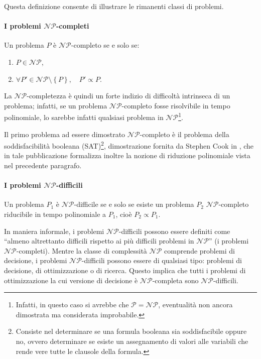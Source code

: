 Questa definizione consente di illustrare le rimanenti classi di problemi.

\paragraph{I problemi $\mathcal{NP}$-completi}
\begin{mydef}
 Un problema $P$ è $\mathcal{NP}$-completo se e solo se:
 \begin{enumerate}
  \item $P \in \mathcal{NP}$,
  \item $\forall P' \in \mathcal{NP} \setminus \left\{P\right\}, \quad P' \propto P$.
 \end{enumerate}
\end{mydef}
La $\mathcal{NP}$-completezza è quindi un forte indizio di difficoltà intrinseca di un 
problema; infatti, se un problema $\mathcal{NP}$-completo fosse risolvibile in tempo 
polinomiale, lo sarebbe infatti qualsiasi problema in $\mathcal{NP}$\footnote{Infatti, in 
questo caso si avrebbe che $\mathcal{P} = \mathcal{NP}$, eventualità non ancora 
dimostrata ma considerata improbabile.}.

Il primo problema ad essere dimostrato $\mathcal{NP}$-completo è il problema della 
soddisfacibilità booleana (SAT)\footnote{Consiste nel determinare se una formula booleana 
sia soddisfacibile oppure no, ovvero determinare se esiste un assegnamento di valori alle 
variabili che rende vere tutte le clausole della formula.}, dimostrazione fornita da 
Stephen Cook in \cite{CookSAT}, che in tale pubblicazione formalizza inoltre la nozione 
di riduzione polinomiale vista nel precedente paragrafo.

\paragraph{I problemi $\mathcal{NP}$-difficili}
\begin{mydef}
 Un problema $P_1$ è $\mathcal{NP}$-difficile se e solo se esiste un problema $P_2$ 
$\mathcal{NP}$-completo riducibile in tempo polinomiale a $P_1$, cioè $P_2 \propto P_1$.
\end{mydef}
In maniera informale, i problemi $\mathcal{NP}$-difficili possono essere definiti come 
``almeno altrettanto difficili rispetto ai più difficili problemi in $\mathcal{NP}$'' (i 
problemi $\mathcal{NP}$-completi). Mentre la classe di complessità $\mathcal{NP}$ 
comprende problemi di decisione, i problemi $\mathcal{NP}$-difficili possono essere 
di qualsiasi tipo: problemi di decisione, di ottimizzazione o di ricerca. Questo 
implica che tutti i problemi di ottimizzazione la cui versione di decisione è 
\mbox{$\mathcal{NP}$-completa} sono $\mathcal{NP}$-difficili.
